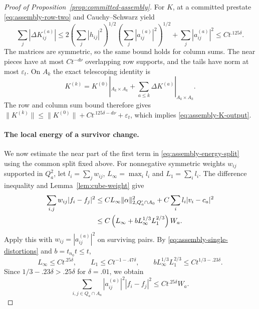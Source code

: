 \begin{proof}[Proof of Proposition~\ref{prop:committed-assembly}]
For $K$, at a committed prestate
\eqref{eq:assembly-row-two} and Cauchy--Schwarz yield
\[
 \sum_j|\Delta K^{(a)}_{ij}|
 \le2\left(\sum_j|h_{ij}|^2\right)^{1/2}
         \left(\sum_j|a^{(a)}_{ij}|^2\right)^{1/2}
       +\sum_j|a^{(a)}_{ij}|^2
 \le Ct^{.125\delta}.
\]
The matrices are symmetric, so the same bound holds for column
sums.  The near pieces have at most $Ct^{-d\nu}$ overlapping
row supports, and the tails have norm at most $\varepsilon_t$.
On $A_k$ the exact telescoping identity is
\[
 K^{(k)}=K^{(0)}|_{A_k\times A_k}
       +\sum_{a\le k}\Delta K^{(a)}|_{A_k\times A_k}.
\]
The row and column sum bound therefore gives
$\|K^{(k)}\|\le\|K^{(0)}\|+Ct^{.125\delta-d\nu}
+\varepsilon_t$, which implies \eqref{eq:assembly-K-output}.

\paragraph{The local energy of a survivor change.}
We now estimate the near part of the first term in
\eqref{eq:assembly-energy-split} using the common split fixed above.
For nonnegative symmetric weights $w_{ij}$ supported in $Q_a^2$,
let $l_i=\sum_jw_{ij}$, $L_\infty=\max_i l_i$ and
$L_1=\sum_i l_i$.  The difference inequality and
Lemma~\ref{lem:cube-weight} give
\begin{align}
 \sum_{i,j}w_{ij}|f_i-f_j|^2
 &\le C L_\infty\|\alpha\|_{2,Q'_a\cap A_0}^2
       +C\sum_i l_i|v_i-c_a|^2\notag\\
 &\le C\left(L_\infty+
       bL_\infty^{1/3}L_1^{2/3}\right)W_a.
 \label{eq:assembly-weighted-local}
\end{align}
Apply this with $w_{ij}=|a^{(a)}_{ij}|^2$ on surviving pairs.
By \eqref{eq:assembly-single-distortions} and $b=t_{n_0}t\le t$,
\[
 L_\infty\le Ct^{.25\delta},\qquad
 L_1\le Ct^{-1-.47\delta},\qquad
 bL_\infty^{1/3}L_1^{2/3}
 \le Ct^{1/3-.23\delta}.
\]
Since $1/3-.23\delta>.25\delta$ for $\delta=.01$, we obtain
\begin{equation}
 \sum_{i,j\in Q_a\cap A_a}
 |a^{(a)}_{ij}|^2|f_i-f_j|^2
 \le Ct^{.25\delta}W_a.
 \label{eq:assembly-delta-local}
\end{equation}


\end{proof}
